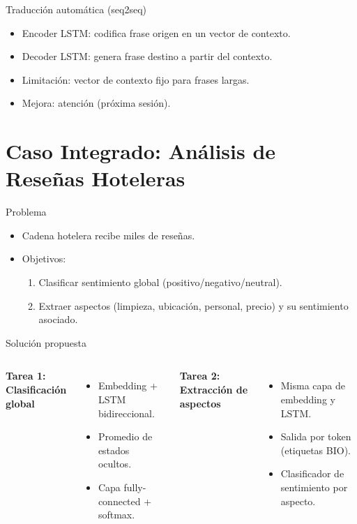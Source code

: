 \documentclass[aspectratio=169, 10pt, xcolor=table]{beamer}
\begin{document}
\begin{frame}{Traducción automática (seq2seq)}
    \begin{itemize}
        \item Encoder LSTM: codifica frase origen en un vector de contexto.
        \item Decoder LSTM: genera frase destino a partir del contexto.
        \item Limitación: vector de contexto fijo para frases largas.
        \item Mejora: atención (próxima sesión).
    \end{itemize}
\end{frame}

\section{Caso Integrado: Análisis de Reseñas Hoteleras}

\begin{frame}{Problema}
    \begin{itemize}
        \item Cadena hotelera recibe miles de reseñas.
        \item Objetivos:
        \begin{enumerate}
            \item Clasificar sentimiento global (positivo/negativo/neutral).
            \item Extraer aspectos (limpieza, ubicación, personal, precio) y su sentimiento asociado.
        \end{enumerate}
    \end{itemize}
\end{frame}

\begin{frame}{Solución propuesta}
    \begin{columns}[t]
        \textbf{Tarea 1: Clasificación global}
        \begin{itemize}
            \item Embedding + LSTM bidireccional.
            \item Promedio de estados ocultos.
            \item Capa fully-connected + softmax.
        \end{itemize}
        \textbf{Tarea 2: Extracción de aspectos}
        \begin{itemize}
            \item Misma capa de embedding y LSTM.
            \item Salida por token (etiquetas BIO).
            \item Clasificador de sentimiento por aspecto.
        \end{itemize}
    \end{columns}
\end{frame}
\end{document}
